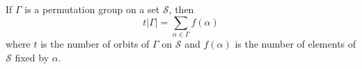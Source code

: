 If $\Gamma$ is a permutation group on a set $\mathcal{S}$, then
$$t|\Gamma| = \sum_{\alpha \in \Gamma} f(\alpha)$$
where $t$ is the number of orbits of $\Gamma$ on $\mathcal{S}$ and $f(\alpha)$ is the number of elements of $\mathcal{S}$ fixed by $\alpha$.
